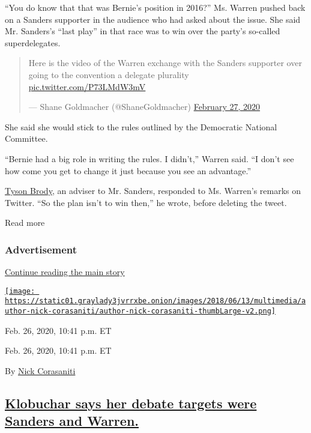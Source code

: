 ``You do know that that was Bernie's position in 2016?'' Ms. Warren
pushed back on a Sanders supporter in the audience who had asked about
the issue. She said Mr. Sanders's ``last play'' in that race was to win
over the party's so-called superdelegates.

\begin{quote}
Here is the video of the Warren exchange with the Sanders supporter over
going to the convention a delegate plurality
\href{https://t.co/P73LMdW3mV}{pic.twitter.com/P73LMdW3mV}

--- Shane Goldmacher (@ShaneGoldmacher)
\href{https://twitter.com/ShaneGoldmacher/status/1232885322586951680?ref_src=twsrc\%5Etfw}{February
27, 2020}
\end{quote}

She said she would stick to the rules outlined by the Democratic
National Committee.

``Bernie had a big role in writing the rules. I didn't,'' Warren said.
``I don't see how come you get to change it just because you see an
advantage.''

\href{https://twitter.com/tysonbrody}{Tyson Brody}, an adviser to Mr.
Sanders, responded to Ms. Warren's remarks on Twitter. ``So the plan
isn't to win then,'' he wrote, before deleting the tweet.

Read more

\hypertarget{advertisement}{%
\subsubsection{Advertisement}\label{advertisement}}

\protect\hyperlink{after-dfp-ad-mid1}{Continue reading the main story}

\href{https://www.nytimes3xbfgragh.onion/by/nick-corasaniti}{\texttt{[image: https://static01.graylady3jvrrxbe.onion/images/2018/06/13/multimedia/author-nick-corasaniti/author-nick-corasaniti-thumbLarge-v2.png]}}

Feb. 26, 2020, 10:41 p.m. ET

Feb. 26, 2020, 10:41 p.m. ET

By \href{https://www.nytimes3xbfgragh.onion/by/nick-corasaniti}{Nick
Corasaniti}

\hypertarget{klobuchar-says-her-debate-targets-were-sanders-and-warren}{%
\subsection{\texorpdfstring{\protect\hyperlink{amy-klobuchar-cnn}{Klobuchar
says her debate targets were Sanders and
Warren.}}{Klobuchar says her debate targets were Sanders and Warren.}}\label{klobuchar-says-her-debate-targets-were-sanders-and-warren}}

